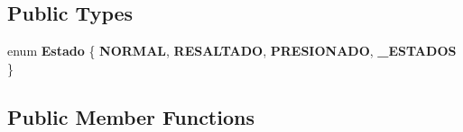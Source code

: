 \subsection*{Public Types}
\begin{DoxyCompactItemize}
\item 
enum {\bfseries Estado} \{ {\bfseries N\+O\+R\+M\+AL}, 
{\bfseries R\+E\+S\+A\+L\+T\+A\+DO}, 
{\bfseries P\+R\+E\+S\+I\+O\+N\+A\+DO}, 
{\bfseries \+\_\+\+E\+S\+T\+A\+D\+OS}
 \}\hypertarget{class_boton_component_a15cc75d9064e182d8acb9240831e873d}{}\label{class_boton_component_a15cc75d9064e182d8acb9240831e873d}

\end{DoxyCompactItemize}
\subsection*{Public Member Functions}
